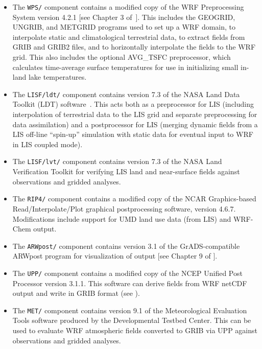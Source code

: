 \begin{itemize}
\item The \texttt{WPS/} component contains a modified copy of the WRF 
  Preprocessing System version 4.2.1 [see Chapter 3 
  of~\cite{ref:ArwUserGuide}]. This includes the GEOGRID, UNGRIB, and METGRID 
  programs used to set up a WRF domain, to interpolate static and 
  climatological terrestrial data, to extract fields from GRIB and GRIB2 
  files, and to horizontally interpolate the fields to the WRF grid. This also
  includes the optional AVG\_TSFC preprocessor, which calculates time-average
  surface temperatures for use in initializing small in-land lake temperatures.

\item The \texttt{LISF/ldt/} component contains version 7.3 of the NASA Land 
  Data Toolkit (LDT) software~\citep{ref:LdtUserGuide}.  This acts both as a 
  preprocessor for LIS (including interpolation of terrestrial data to the LIS
  grid and separate preprocessing for data assimilation) and a postprocessor 
  for LIS (merging dynamic fields from a LIS off-line ``spin-up'' simulation 
  with static data for eventual input to WRF in LIS coupled mode).

\item The \texttt{LISF/lvt/} component contains version 7.3 of the NASA Land 
  Verification Toolkit \citep{ref:LvtUserGuide} for verifying LIS land and 
  near-surface fields against observations and gridded analyses.

\item The \texttt{RIP4/} component contains a modified copy of the NCAR 
  Graphics-based Read/Interpolate/Plot \citep{ref:RipUserGuide} graphical 
  postprocessing software, version 4.6.7. Modifications include support
  for UMD land use data (from LIS) and WRF-Chem output.

\item The \texttt{ARWpost/} component contains version 3.1 of the 
  GrADS-compatible ARWpost program for visualization of output [see Chapter 9 
  of \cite{ref:ArwUserGuide}].

\item The \texttt{UPP/} component contains a modified copy of the NCEP Unified 
  Post Processor version 3.1.1. This software can derive fields from WRF netCDF 
  output and write in GRIB format (see \cite{ref:UppUserGuide}).

\item The \texttt{MET/} component contains version 9.1 of the Meteorological 
  Evaluation Tools \citep{ref:MetUserGuide} software produced by the 
  Developmental Testbed Center. This can be used to evaluate WRF atmospheric 
  fields converted to GRIB via UPP against observations and gridded analyses.


\end{itemize}
